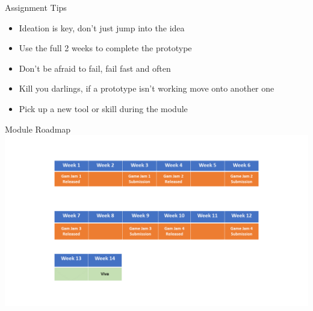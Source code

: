\begin{frame}{Assignment Tips}
	\begin{itemize}
		\item Ideation is key, don't just jump into the idea
		\item Use the full 2 weeks to complete the prototype
		\item Don't be afraid to fail, fail fast and often
		\item Kill you darlings, if a prototype isn't working move onto another one
		\item Pick up a new tool or skill during the module
	\end{itemize}
\end{frame}

\begin{frame}{Module Roadmap}
	\includegraphics[width=1.0\textwidth]{GAM702_Road_Map}
\end{frame}
